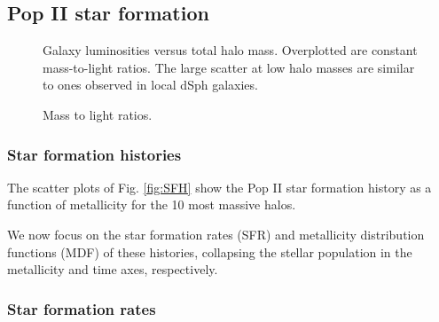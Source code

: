\documentclass[useAMS,usenatbib]{mn2e}
\begin{document}
\subsection{Pop II star formation}

\begin{figure*}
  \caption{\label{fig:SFH} The scatter plots show the Pop II star
    formation history as a function of metallicity for the 10 most
    massive halos.  Halo 8 is not shown because it contains no stars.
    Each circle represents a star particle, whose area is proportional
    to its mass.  The open circles in the upper right represent $M =
    10^3$, $10^4$, and $10^5$ \Ms.  The dashed lines in the Halo 0
    panel guide the eye to two stellar populations that were formed in
    two satellite halos, merging at $z=7.5$.  The upper histogram
    shows the star formation rate.  The right histogram depicts the
    Pop II metallicity distribution function.}
\end{figure*}

\begin{figure}
  \caption{\label{fig:Lstar} Galaxy luminosities versus total halo
    mass.  Overplotted are constant mass-to-light ratios.  The large
    scatter at low halo masses are similar to ones observed in local
    dSph galaxies.}
\end{figure}

\begin{figure}
  \caption{\label{fig:ML} Mass to light ratios.}
\end{figure}

\subsubsection{Star formation histories}

The scatter plots of Fig. \ref{fig:SFH} show the Pop II star formation
history as a function of metallicity for the 10 most massive halos.

We now focus on the star formation rates (SFR) and metallicity
distribution functions (MDF) of these histories, collapsing the
stellar population in the metallicity and time axes, respectively.

\subsubsection{Star formation rates}
\end{document}

